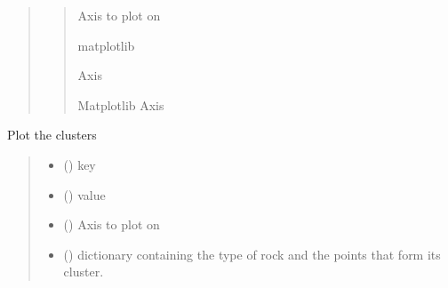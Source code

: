 \documentclass[letterpaper,10pt,english]{sphinxmanual}
\begin{document}
\begin{fulllineitems}
\begin{fulllineitems}
\begin{quote}
\begin{quote}
\begin{description}
\sphinxAtStartPar
Axis to plot on

\sphinxAtStartPar
matplotlib

\sphinxAtStartPar
Axis

\sphinxAtStartPar
Matplotlib Axis

\end{description}\end{quote}
\end{quote}

\end{fulllineitems}


\begin{fulllineitems}
\label{\detokenize{pyrockmodulus:pyrockmodulus.pyrockmodulus.modulus_ratio.plot_clusters}}
\pysigstartsignatures
{}
\pysigstopsignatures
\sphinxAtStartPar
Plot the clusters
\begin{quote}\begin{description}
\begin{itemize}
\item {} 
\sphinxAtStartPar
{} () \textendash{} key

\item {} 
\sphinxAtStartPar
{} () \textendash{} value

\item {} 
\sphinxAtStartPar
{} () \textendash{} Axis to plot on

\item {} 
\sphinxAtStartPar
{} () \textendash{} dictionary containing the type of rock and the points that form its cluster.

\end{itemize}


\end{description}
\end{quote}
\end{fulllineitems}
\end{fulllineitems}
\end{document}

